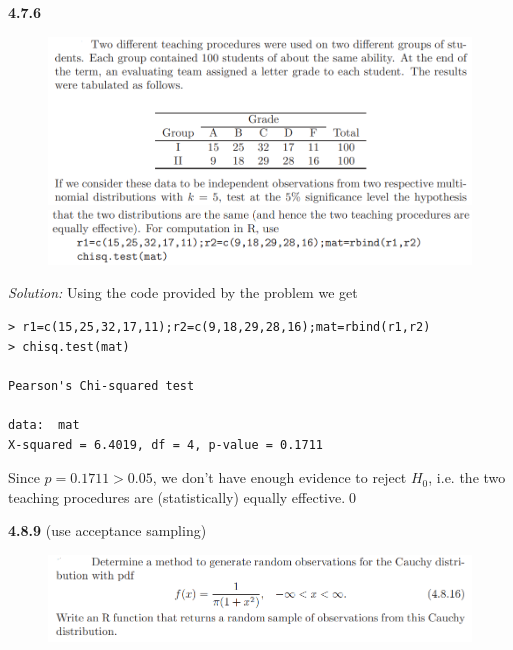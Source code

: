 \documentclass{book}
\theoremstyle{definition}
\begin{document}
\newpage
\noindent\textbf{4.7.6}
\begin{figure}[!htb]
	\centering
	\includegraphics[scale=0.5]{476a}
	\includegraphics[scale=0.5]{476b}
\end{figure}



\noindent \textit{Solution:} Using the code provided by the problem we get
\begin{lstlisting}
> r1=c(15,25,32,17,11);r2=c(9,18,29,28,16);mat=rbind(r1,r2)
> chisq.test(mat)

Pearson's Chi-squared test

data:  mat
X-squared = 6.4019, df = 4, p-value = 0.1711
\end{lstlisting}
Since $p = 0.1711 > 0.05$, we don't have enough evidence to reject $H_0$, i.e. the two teaching procedures are (statistically) equally effective.\qed 

















\newpage
\noindent\textbf{4.8.9} (use acceptance sampling)
\begin{figure}[!htb]
	\centering
	\includegraphics[scale=0.5]{489}
\end{figure}
\end{document}
